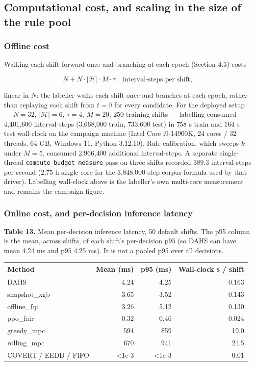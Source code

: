 \documentclass[review,3p,times]{elsarticle}
\newcounter{none}
\theoremstyle{definition}
\begin{document}
\subsection{Computational cost, and scaling in the size of the rule
pool}\label{computational-cost-and-scaling-in-the-size-of-the-rule-pool}

\subsubsection{Offline cost}\label{offline-cost}

Walking each shift forward once and branching at each epoch (Section
4.3) costs

\[ N + N \cdot |\mathcal{H}| \cdot M \cdot \tau \quad \text{interval-steps per shift,} \]

linear in \(N\): the labeller walks each shift once and branches at each
epoch, rather than replaying each shift from \(t=0\) for every
candidate. For the deployed setup --- \(N=32\), \(|\mathcal{H}|=6\),
\(\tau=4\), \(M=20\), 250 training shifts --- labelling consumed
4,401,600 interval-steps (3,668,000 train, 733,600 test) in \(758\) s
train and \(164\) s test wall-clock on the campaign machine (Intel Core
i9-14900K, 24 cores / 32 threads, 64 GB, Windows 11, Python 3.12.10).
Rule calibration, which sweeps \(k\) under \(M=5\), consumed 2,966,400
additional interval-steps. A separate single-thread
\texttt{compute\_budget\ measure} pass on three shifts recorded
\(389.3\) interval-steps per second (\(2.75\) h single-core for the
3,848,000-step corpus formula used by that driver). Labelling wall-clock
above is the labeller's own multi-core measurement and remains the
campaign figure.

\subsubsection{Online cost, and per-decision inference
latency}\label{online-cost-and-per-decision-inference-latency}

\textbf{Table 13.} Mean per-decision inference latency, 50 default
shifts. The p95 column is the mean, across shifts, of each shift's
per-decision p95 (so DAHS can have mean 4.24 ms and p95 4.25 ms). It is
not a pooled p95 over all decisions.

{\def\LTcaptype{none} %
\begin{longtable}[]{@{}lrrr@{}}
\toprule\noalign{}
Method & Mean (ms) & p95 (ms) & Wall-clock s / shift \\
\midrule\noalign{}
\endhead
\bottomrule\noalign{}
\endlastfoot
DAHS & 4.24 & 4.25 & 0.163 \\
snapshot\_xgb & 3.65 & 3.52 & 0.143 \\
offline\_fqi & 3.26 & 5.12 & 0.130 \\
ppo\_fair & 0.32 & 0.46 & 0.024 \\
greedy\_mpc & 594 & 859 & 19.0 \\
rolling\_mpc & 670 & 941 & 21.5 \\
COVERT / EEDD / FIFO & \textless1e-3 & \textless1e-3 & 0.01 \\
\end{longtable}
}
\end{document}
